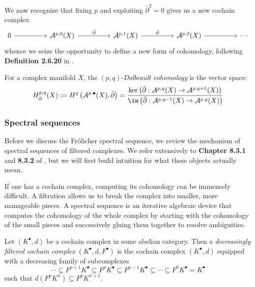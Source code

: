 \noindent We now recognize that fixing $p$ and exploiting $\bar\partial^2=0$ gives us a new cochain complex
\[\begin{tikzcd}
	0 && {\mathcal{A}^{p,0}(X)} && {\mathcal{A}^{p,1}(X)} && {\mathcal{A}^{p,2}(X)} && \cdots
	\arrow[from=1-1, to=1-3]
	\arrow["{\bar\partial}", from=1-3, to=1-5]
	\arrow["{\bar\partial}", from=1-5, to=1-7]
	\arrow[from=1-7, to=1-9]
\end{tikzcd}\]
whence we seize the opportunity to define a new form of cohomology, following \textbf{Definition 2.6.20} in \cite{Huybrechts2005}.

\begin{definition}
    For a complex manifold $X$, the $(p,q)$-\emph{Dolbeault cohomology} is the vector space:
    $$
    H^{p,q}_{\bar\partial}(X) := H^q\left(\mathcal{A}^{p,\bullet}(X), \bar\partial\right) = \frac{\ker \left(\bar\partial:\mathcal{A}^{p,q}(X) \to \mathcal{A}^{p,q+1}(X)\right)}{\im \left(\bar\partial:\mathcal{A}^{p,q-1}(X) \to \mathcal{A}^{p,q}(X)\right)}
    $$
\end{definition}


\subsubsection{Spectral sequences}
Before we discuss the Fr\"olicher spectral sequence, we review the mechanism of spectral sequences of filtered complexes. We refer extensively to \textbf{Chapter 8.3.1} and \textbf{8.3.2} of \cite{VoisinI2002}, but we will first build intuition for what these objects actually mean.

\medskip

\noindent If one has a cochain complex, computing its cohomology can be immensely difficult. A filtration allows us to break the complex into smaller, more manageable pieces. A spectral sequence is an iterative algebraic device that computes the cohomology of the whole complex by starting with the cohomology of the small pieces and successively gluing them together to resolve ambiguities.
\begin{definition}
    Let $\left(K^\bullet,d\right)$ be a cochain complex in some abelian category. Then a \emph{decreasingly filtered cochain complex} $\left(K^\bullet, d, F^\bullet\right)$ is the cochain complex $\left(K^\bullet, d\right)$ equipped with a decreasing family of subcomplexes
    $$
    \cdots \subseteq F^{p+1} K^\bullet \subseteq F^p K^\bullet \subseteq F^{p-1} K^\bullet \subseteq \cdots \subseteq F^0K^\bullet  = K^\bullet
    $$
    such that $d\left(F^pK^n\right)\subseteq F^pK^{n+1}$. 
\end{definition}

